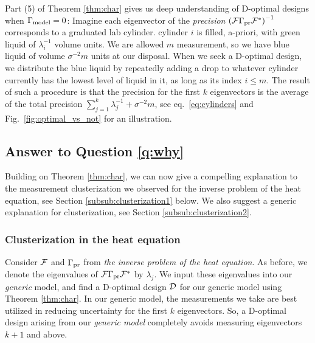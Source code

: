 Part (5) of Theorem \ref{thm:char} gives us deep understanding of
D-optimal designs when $\Gamma_{\textup{model}} = 0$: Imagine each eigenvector of the
\emph{precision} $\left(\mathcal{F} \Gamma_{\textup{pr}} \mathcal{F}^*\right )^{-1}$ corresponds
to a graduated lab cylinder. %
cylinder $i$ is filled, a-priori, with green liquid of
$\lambda_i^{-1}$ volume units. We are allowed $m$ measurement, so we
have blue liquid of volume $\sigma^{-2}m$ units at our disposal. When
we seek a D-optimal design, we distribute the blue liquid by
repeatedly adding a drop to whatever cylinder currently has the lowest
level of liquid in it, as long as its index $i \leq m$. The result of
such a procedure is that the precision for the first $k$ eigenvectors
is the average of the total precision $\sum_{j=1}^k \lambda_j^{-1} +
\sigma^{-2}m$, see eq.~\eqref{eq:cylinders} and
Fig.~\ref{fig:optimal_vs_not} for an illustration.



\subsection{Answer to Question \ref{q:why}}\label{subsec:why}
Building on Theorem \ref{thm:char}, we can now give a compelling
explanation to the measurement clusterization we observed for the
inverse problem of the heat equation, see Section
\ref{subsub:clusterization1} below. We also suggest a generic
explanation for clusterization, see Section \ref{subsub:clusterization2}.

\subsubsection{Clusterization in the heat equation}
Consider $\mathcal{F}$ and $\Gamma_{\textup{pr}}$ from \emph{the inverse problem of the
heat equation}. As before, we denote the eigenvalues of
$\mathcal{F}\Gamma_{\textup{pr}}\mathcal{F}^*$ by $\lambda_j$. We input these eigenvalues into our
\emph{generic} model, and find a D-optimal design $\mathcal{D}$ for our
generic model using Theorem \ref{thm:char}. In our generic model, the
measurements we take are best utilized in reducing uncertainty for the
first $k$ eigenvectors. So, a D-optimal design arising from our
\emph{generic model} completely avoids measuring eigenvectors $k+1$
and above.

